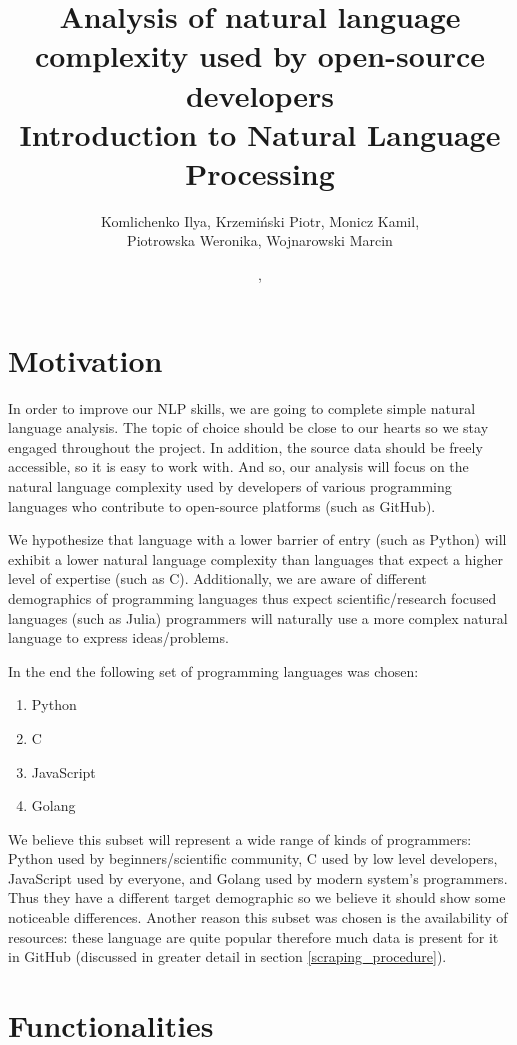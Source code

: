 \documentclass[]{article}
\title{Analysis of natural language complexity used by open-source developers\\ \large Introduction to Natural Language Processing}
\author{Komlichenko Ilya, Krzemiński Piotr, Monicz Kamil, \\Piotrowska Weronika, Wojnarowski Marcin}
\date{\monthname, \the\year}
\begin{document}
\maketitle

{\hypersetup{linkcolor=black}\tableofcontents}
\newpage


\section{Motivation}

In order to improve our NLP skills, we are going to complete simple natural language analysis. The topic of choice should be close to our hearts so we stay engaged throughout the project. In addition, the source data should be freely accessible, so it is easy to work with. And so, our analysis will focus on the natural language complexity used by developers of various programming languages who contribute to open-source platforms (such as GitHub).

We hypothesize that language with a lower barrier of entry (such as Python) will exhibit a lower natural language complexity than languages that expect a higher level of expertise (such as C). Additionally, we are aware of different demographics of programming languages thus expect scientific/research focused languages (such as Julia) programmers will naturally use a more complex natural language to express ideas/problems.

In the end the following set of programming languages was chosen:

\begin{enumerate}
    \item Python
    \item C
    \item JavaScript
    \item Golang
\end{enumerate}

We believe this subset will represent a wide range of kinds of programmers: Python used by beginners/scientific community, C used by low level developers, JavaScript used by everyone, and Golang used by modern system's programmers. Thus they have a different target demographic so we believe it should show some noticeable differences. Another reason this subset was chosen is the availability of resources: these language are quite popular therefore much data is present for it in GitHub (discussed in greater detail in section \ref{scraping_procedure}).

\section{Functionalities}
\end{document}
